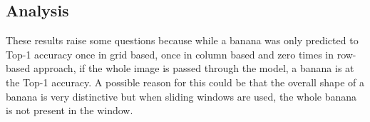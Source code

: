 \tocless\subsection{Analysis}
These results raise some questions because while a banana was only predicted to
Top-1 accuracy once in grid based, once in column based and zero times in row-based approach, if the whole image is passed through the model, a banana is at the Top-1 accuracy.
A possible reason for this could be that the overall shape of a banana is very distinctive but when sliding windows are used, the whole banana is not present in the window.

\afterpage{\clearpage}






















